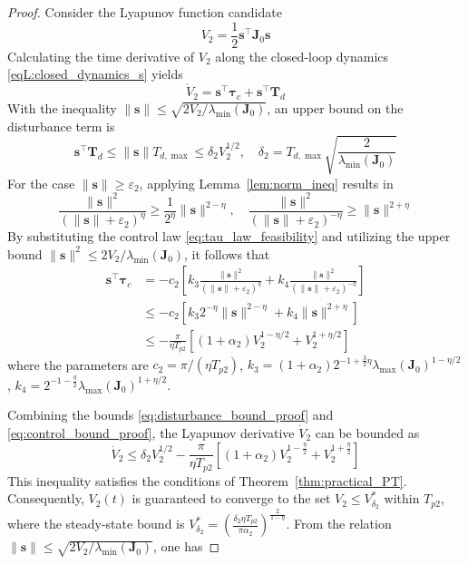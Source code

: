 \documentclass[journal]{new-aiaa}
\begin{document}
\begin{proof}
Consider the Lyapunov function candidate
\begin{equation}
V_2 = \frac{1}{2} \boldsymbol{s}^\top \boldsymbol{J}_0 \boldsymbol{s}
\end{equation}
Calculating the time derivative of $V_2$ along the closed-loop dynamics \eqref{eqL:closed_dynamics_s} yields
\begin{equation}
\dot{V}_2 = \boldsymbol{s}^\top \boldsymbol{\tau}_c + \boldsymbol{s}^\top \boldsymbol{T}_d
\end{equation}
With the inequality $\|\boldsymbol{s}\| \le \sqrt{2 V_2 / \lambda_{\min}(\boldsymbol{J}_0)}$, an upper bound on the disturbance term is
\begin{equation}
\boldsymbol{s}^\top \boldsymbol{T}_d \le \|\boldsymbol{s}\| T_{d,\max}
\le \delta_2 V_2^{1/2}, \quad \delta_2 = T_{d,\max} \sqrt{\frac{2}{\lambda_{\min}(\boldsymbol{J}_0)}}
\label{eq:disturbance_bound_proof}
\end{equation}
For the case $\|\boldsymbol{s}\| \ge \varepsilon_2$, applying Lemma~\ref{lem:norm_ineq} results in
\[
\frac{\|\boldsymbol{s}\|^2}{(\|\boldsymbol{s}\| + \varepsilon_2)^\eta} \ge \frac{1}{2^\eta} \|\boldsymbol{s}\|^{2 - \eta},
\quad
\frac{\|\boldsymbol{s}\|^2}{(\|\boldsymbol{s}\| + \varepsilon_2)^{-\eta}} \ge \|\boldsymbol{s}\|^{2 + \eta}
\]
By substituting the control law \eqref{eq:tau_law_feasibility} and 
utilizing the upper bound $\|\boldsymbol{s}\|^2 \le 2 V_2 / \lambda_{\min}(\boldsymbol{J}_0)$, it follows that
\begin{align}
\boldsymbol{s}^\top \boldsymbol{\tau}_c
&= -c_2 \left[
k_3 \frac{\|\boldsymbol{s}\|^2}{(\|\boldsymbol{s}\| + \varepsilon_2)^\eta}
+ k_4 \frac{\|\boldsymbol{s}\|^2}{(\|\boldsymbol{s}\| + \varepsilon_2)^{-\eta}}
\right]
\nonumber \\
&\le -c_2 \left[
k_3 2^{-\eta} \|\boldsymbol{s}\|^{2 - \eta}
+ k_4 \|\boldsymbol{s}\|^{2 + \eta}
\right]
\nonumber \\
&\le -\frac{\pi}{\eta T_{p2}} \left[
(1 + \alpha_2) V_2^{1 - \eta/2} + V_2^{1 + \eta/2}
\right]
\label{eq:control_bound_proof}
\end{align}
where the parameters are $c_2 = \pi/(\eta T_{p2})$, $k_3 = (1 + \alpha_2) 2^{-1 + \frac{3}{2}\eta} \lambda_{\max}(\boldsymbol{J}_0)^{1 - \eta/2}$,
$k_4 = 2^{-1 - \frac{\eta}{2}} \lambda_{\max}(\boldsymbol{J}_0)^{1 + \eta/2}$.

Combining the bounds \eqref{eq:disturbance_bound_proof} and \eqref{eq:control_bound_proof}, the Lyapunov derivative $\dot{V}_2$ can be bounded as
\begin{equation}
\dot{V}_2 \le \delta_2 V_2^{1/2} - \frac{\pi}{\eta T_{p2}} \left[ (1 + \alpha_2) V_2^{1 - \frac{\eta}{2}} + V_2^{1 + \frac{\eta}{2}} \right]
\end{equation}
This inequality satisfies the conditions of Theorem~\ref{thm:practical_PT}. Consequently, $V_2(t)$ is guaranteed to converge to the set $V_2 \le V^*_{\delta_2}$ within $T_{p2}$, where the steady-state bound is $V^*_{\delta_2} = \left(\frac{\delta_2 \eta T_{p2}}{\pi \alpha_2}\right)^{\frac{2}{1-\eta}}$. From the relation $\|\boldsymbol{s}\| \le \sqrt{2 V_2 / \lambda_{\min}(\boldsymbol{J}_0)}$, one has


\end{proof}
\end{document}
